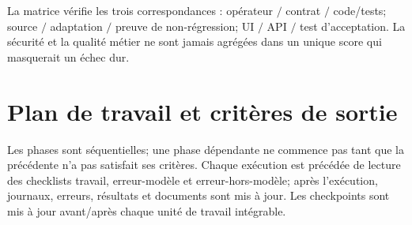 \documentclass[10pt,a4paper]{article}
\begin{document}
La matrice vérifie les trois correspondances : opérateur $ / $ contrat $ / $ code/tests; source $ / $ adaptation $ / $ preuve de non-régression; UI $ / $ API $ / $ test d'acceptation. La sécurité et la qualité métier ne sont jamais agrégées dans un unique score qui masquerait un échec dur.

\section{Plan de travail et critères de sortie}
Les phases sont séquentielles; une phase dépendante ne commence pas tant que la précédente n'a pas satisfait ses critères. Chaque exécution est précédée de lecture des checklists travail, erreur-modèle et erreur-hors-modèle; après l'exécution, journaux, erreurs, résultats et documents sont mis à jour. Les checkpoints sont mis à jour avant/après chaque unité de travail intégrable.
\end{document}
